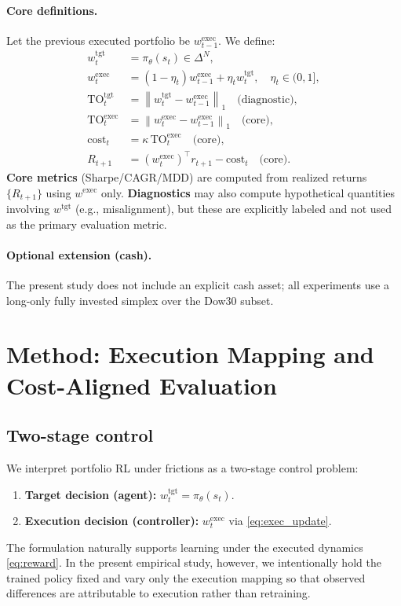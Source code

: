 \documentclass[10pt,twocolumn]{article}
\newcommand{\wexec}{w^{\mathrm{exec}}}
\newcommand{\wtgt}{w^{\mathrm{tgt}}}
\newcommand{\TOexec}{\mathrm{TO}^{\mathrm{exec}}}
\newcommand{\TOtgt}{\mathrm{TO}^{\mathrm{tgt}}}
\newcommand{\kappaTC}{\kappa}
\newcommand{\normone}[1]{\left\lVert #1 \right\rVert_1}
\newcommand{\DeltaN}{\Delta^N}
\begin{document}
\paragraph{Core definitions.}
Let the previous executed portfolio be $\wexec_{t-1}$. We define:
\begin{align}
\wtgt_t &= \pi_\theta(s_t)\in\DeltaN, \label{eq:tgt_policy}\\
\wexec_t &= (1-\eta_t)\wexec_{t-1} + \eta_t \wtgt_t,\quad \eta_t\in(0,1], \label{eq:exec_update}\\
\TOtgt_t &= \normone{\wtgt_t - \wexec_{t-1}}\quad\text{(diagnostic)}, \label{eq:turnover_tgt}\\
\TOexec_t &= \normone{\wexec_t - \wexec_{t-1}}\quad\text{(core)}, \label{eq:turnover_exec}\\
\mathrm{cost}_{t} &= \kappaTC \, \TOexec_t \quad\text{(core)}, \label{eq:cost_exec}\\
R_{t+1} &= (\wexec_t)^\top r_{t+1} - \mathrm{cost}_t \quad\text{(core)}.\label{eq:reward}
\end{align}
\textbf{Core metrics} (Sharpe/CAGR/MDD) are computed from realized returns $\{R_{t+1}\}$ using $\wexec$ only. \textbf{Diagnostics} may also compute hypothetical quantities involving $\wtgt$ (e.g., misalignment), but these are explicitly labeled and not used as the primary evaluation metric.

\paragraph{Optional extension (cash).}
The present study does not include an explicit cash asset; all experiments use a long-only fully invested simplex over the Dow30 subset.

\section{Method: Execution Mapping and Cost-Aligned Evaluation}
\subsection{Two-stage control}
We interpret portfolio RL under frictions as a two-stage control problem:
\begin{enumerate}[leftmargin=*,itemsep=1pt]
\item \textbf{Target decision (agent):} $\wtgt_t=\pi_\theta(s_t)$.
\item \textbf{Execution decision (controller):} $\wexec_t$ via \eqref{eq:exec_update}.
\end{enumerate}
The formulation naturally supports learning under the executed dynamics \eqref{eq:reward}. In the present empirical study, however, we intentionally hold the trained policy fixed and vary only the execution mapping so that observed differences are attributable to execution rather than retraining.
\end{document}
